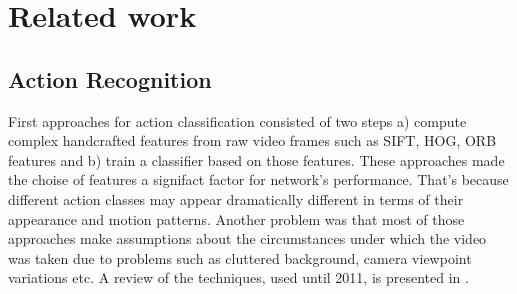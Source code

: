 
 
%  


% 

\chapter{Related work}




\section{Action Recognition}
First approaches for action classification consisted of two steps a) compute complex handcrafted features from raw video frames
such as SIFT, HOG, ORB features and b) train a classifier based on those features. These approaches made the choise of
features a signifact factor for network's performance. That's because different action classes may appear dramatically
different in terms of their appearance and motion patterns. Another problem was that most of those approaches make
assumptions about the circumstances under which the video was taken due to problems such as cluttered
background, camera viewpoint variations etc. A review of the techniques, used until 2011, is presented in \cite{Aggarwal:2011:HAA:1922649.1922653}. \par

